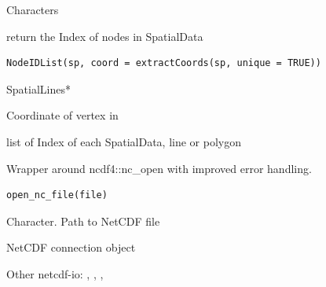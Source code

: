 \documentclass[a4paper]{book}
\begin{document}
%
\begin{Value}
Characters
\end{Value}
%
\begin{Description}\relax
return the Index of nodes in SpatialData
\end{Description}
%
\begin{Usage}
\begin{verbatim}
NodeIDList(sp, coord = extractCoords(sp, unique = TRUE))
\end{verbatim}
\end{Usage}
%
\begin{Arguments}
\begin{ldescription}
\item[\code{sp}] SpatialLines*

\item[\code{coord}] Coordinate of vertex in 
\end{ldescription}
\end{Arguments}
%
\begin{Value}
list of Index of each SpatialData, line or polygon
\end{Value}
%
\begin{Description}\relax
Wrapper around ncdf4::nc\_open with improved error handling.
\end{Description}
%
\begin{Usage}
\begin{verbatim}
open_nc_file(file)
\end{verbatim}
\end{Usage}
%
\begin{Arguments}
\begin{ldescription}
\item[\code{file}] Character. Path to NetCDF file
\end{ldescription}
\end{Arguments}
%
\begin{Value}
NetCDF connection object
\end{Value}
%
\begin{SeeAlso}\relax
Other netcdf-io: 
,
,
,
\end{SeeAlso}
\end{document}
